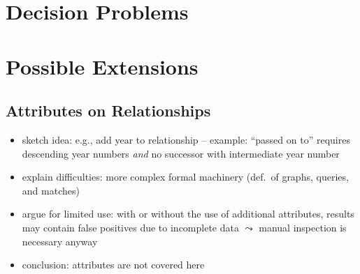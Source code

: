 \section{Decision Problems}
\label{sec:decision_problems}


\section{Possible Extensions}
\label{sec:possible_extensions}


\subsection*{Attributes on Relationships}

\begin{itemize}
  \item
    sketch idea: e.g., add year to relationship  -- example: \enquote{passed on to} requires descending year numbers \emph{and} no successor with intermediate year number
  \item
    explain difficulties: more complex formal machinery (def.\ of graphs, queries, and matches)
  \item
    argue for limited use: with or without the use of additional attributes, results may contain false positives due to incomplete data $\leadsto$ manual inspection is necessary anyway
  \item
    conclusion: attributes are not covered here
\end{itemize}

